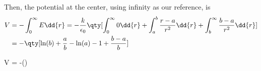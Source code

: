 \documentclass[12pt,a4paper]{article}
\begin{document}
Then, the potential at the center, using infinity as our reference, is
\begin{align*}
V &= -\int_{0}^{\infty} E \dd{r} = -\frac{k}{\epsilon_0}\qty[ \int_{0}^{\infty} 0\dd{r} + \int_{a}^{b} \frac{r-a}{r^2} \dd{r} + \int_{b}^{\infty} \frac{b-a}{r^2} \dd{r}] \\
&= -\qty[\ln(b) + \frac{a}{b} - \ln(a) - 1 + \frac{b-a}{b}]
\end{align*}
\begin{eqbox}
V = -\ln()
\end{eqbox}
\end{document}

